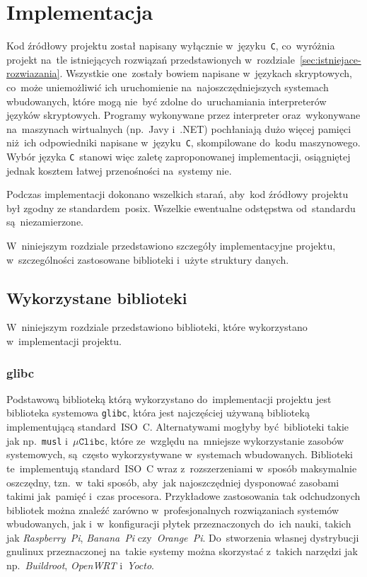 \documentclass[thesis]{subfiles}
\begin{document}
\chapter{Implementacja}
\label{chapter:implementacja}

Kod źródłowy projektu został napisany wyłącznie w~języku~\texttt{C}, co~wyróżnia projekt na~tle istniejących rozwiązań przedstawionych w~rozdziale~\ref{sec:istniejace-rozwiazania}. Wszystkie one~zostały bowiem napisane w~językach skryptowych, co~może uniemożliwić ich uruchomienie na~najoszczędniejszych systemach wbudowanych, które mogą nie~być zdolne do~uruchamiania interpreterów języków skryptowych. Programy wykonywane przez interpreter oraz~wykonywane na~maszynach wirtualnych (np.~Javy i~.NET) pochłaniają dużo więcej pamięci niż~ich odpowiedniki napisane w~języku~\texttt{C}, skompilowane do~kodu maszynowego. Wybór języka \texttt{C}~stanowi więc zaletę zaproponowanej implementacji, osiągniętej jednak kosztem łatwej przenośności na~systemy nie.

Podczas implementacji dokonano wszelkich starań, aby~kod źródłowy projektu był zgodny ze standardem~\gls{posix}. Wszelkie ewentualne odstępstwa od~standardu są~niezamierzone.

W~niniejszym rozdziale przedstawiono szczegóły implementacyjne projektu, w~szczególności zastosowane biblioteki i~użyte struktury danych.


\section{Wykorzystane biblioteki}

W~niniejszym rozdziale przedstawiono biblioteki, które wykorzystano w~implementacji projektu.


\subsection{glibc}

Podstawową biblioteką którą wykorzystano do~implementacji projektu jest biblioteka systemowa \texttt{glibc}, która jest najczęściej używaną biblioteką implementującą standard~ISO~C. Alternatywami mogłyby być~biblioteki takie jak np.~\texttt{musl} i~$\mu\texttt{Clibc}$, które ze~względu na~mniejsze wykorzystanie zasobów systemowych, są~często wykorzystywane w~systemach wbudowanych. Biblioteki te~implementują standard~ISO~C wraz z~rozszerzeniami w~sposób maksymalnie oszczędny, tzn.~w~taki sposób, aby~jak najoszczędniej dysponować zasobami takimi jak~pamięć i~czas procesora. Przykładowe zastosowania tak odchudzonych bibliotek można znaleźć zarówno w~profesjonalnych rozwiązaniach systemów wbudowanych, jak i~w~konfiguracji płytek przeznaczonych do~ich nauki, takich jak \emph{Raspberry~Pi}, \emph{Banana~Pi} czy~\emph{Orange~Pi}. Do~stworzenia własnej dystrybucji \gls{gnulinux} przeznaczonej na~takie systemy można skorzystać z~takich narzędzi jak np.~\emph{Buildroot}, \emph{OpenWRT} i~\emph{Yocto}.
\end{document}
